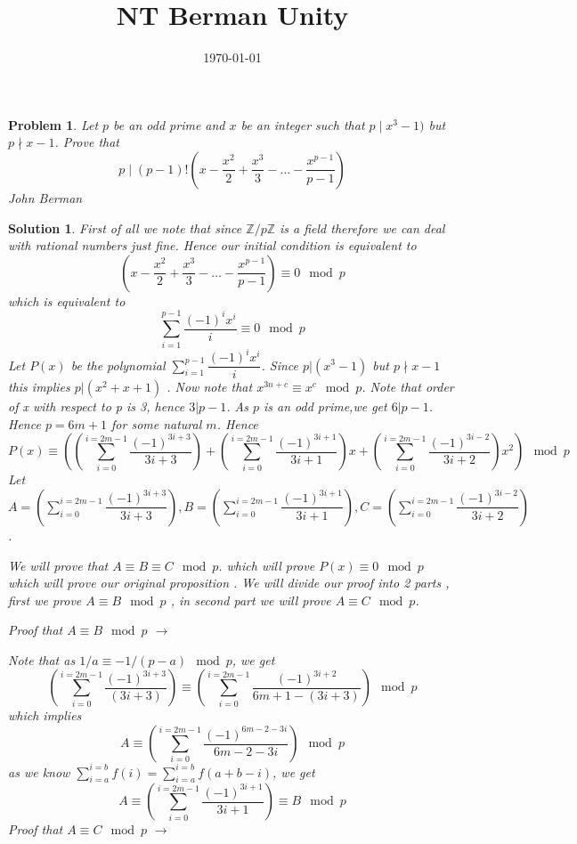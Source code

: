 \documentclass{article}
\title{NT Berman Unity}
\date{\today}
\newtheorem*{problem}{Problem}
\newtheorem*{solution}{Solution}
\begin{document}
	
	\maketitle
	
	\begin{problem}
		Let $p$ be an odd prime and $x$ be an integer such that $p \mid x^3 - 1)$ but $p \nmid x-1$. Prove that
		\[
		p \mid (p-1)! \left( x - \frac{x^2}{2} + \frac{x^3}{3} - \dots - \frac{x^{p-1}}{p-1} \right) 
		\]
		\textit{John Berman}
	\end{problem}
	
	\begin{solution}
		First of all we note that since $ \mathbb{Z}/p\mathbb{Z}$ is a field therefore we can deal with rational numbers just fine. Hence our initial condition is equivalent to 
		\[
		\left( x - \frac{x^2}{2} + \frac{x^3}{3} - \dots - \frac{x^{p-1}}{p-1} \right)  \equiv 0 \mod p
		\]
		which is equivalent to 
		\[
		\sum_{i=1}^{p-1} \dfrac{(-1)^i x^ i }{i} \equiv 0 \mod p
		\]
		Let $P(x)$ be the polynomial $\sum_{i=1}^{p-1} \dfrac{(-1)^i x^ i }{i}$.
		Since $p|(x^3 -1 )$ but $p\nmid x-1 $ this implies $p|(x^2+x+1)$ . Now note that $x^{3n+c} \equiv  x^c  \mod p $.
				Note that order of x with respect to p is 3, hence $3|p-1$. As $p$ is an odd prime,we get $6|p-1$. Hence $p=6m+1$ for some natural $m$. 
		 Hence 
		\[
		P(x) \equiv \left( \left(  \sum_{i=0}^{i=2m-1} \dfrac{(-1)^{3i+3} }{3i+3}  \right)  + \left(  \sum_{i=0}^{i=2m-1} \dfrac{(-1)^{3i+1} }{3i+1} \right) x + \left(  \sum_{i=0}^{i=2m-1} \dfrac{(-1)^{3i-2} }{3i+2} \right) x^2   \right)  \mod p
		\]
		Let $A=\left(  \sum_{i=0}^{i=2m-1} \dfrac{(-1)^{3i+3} }{3i+3}  \right) , B = \left(  \sum_{i=0}^{i=2m-1} \dfrac{(-1)^{3i+1} }{3i+1} \right)   , C =  \left(  \sum_{i=0}^{i=2m-1} \dfrac{(-1)^{3i-2} }{3i+2} \right) $ . 
		
		We will prove that $A \equiv B \equiv C \mod p$. which will prove $P(x) \equiv 0 \mod p$  which will prove our original proposition . We will divide our proof into 2 parts , first we prove $A \equiv B \mod p$ , in second part we will prove $A \equiv C \mod p$. 

		Proof that $A \equiv B \mod p$ $\to$
		
		Note that  as $1/a \equiv -1/(p-a) \mod p$, we get
		\[
		\left(  \sum_{i=0}^{i=2m-1} \dfrac{(-1)^{3i+3} }{(3i+3)}  \right) \equiv \left(  \sum_{i=0}^{i=2m-1} \dfrac{(-1)^{3i+2} }{6m+1 -(3i+3)}  \right) \mod p
		\]
		which implies
		\[
		A \equiv \left(  \sum_{i=0}^{i=2m-1} \dfrac{(-1)^{6m-2-3i} }{6m-2-3i}  \right) \mod p
		\]
		as we know $\sum_{i=a}^{i=b} f(i) = \sum_{i=a}^{i=b} f(a+b-i)$, we get
		\[
		A \equiv \left(  \sum_{i=0}^{i=2m-1} \dfrac{(-1)^{3i+1} }{3i+1}  \right) \equiv B \mod p
		\]
		Proof that $A \equiv C \mod p$ $\to$
		

\end{solution}
\end{document}
